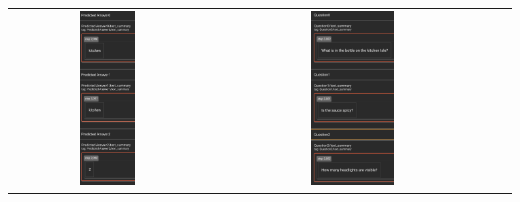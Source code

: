 \documentclass{article}
\begin{document}
\begin{tabular}{ccc}
    \includegraphics[width=0.3\textwidth]{q2.6_21.png} &
    \includegraphics[width=0.3\textwidth]{q2.6_22.png} \\
\end{tabular}
\end{document}
